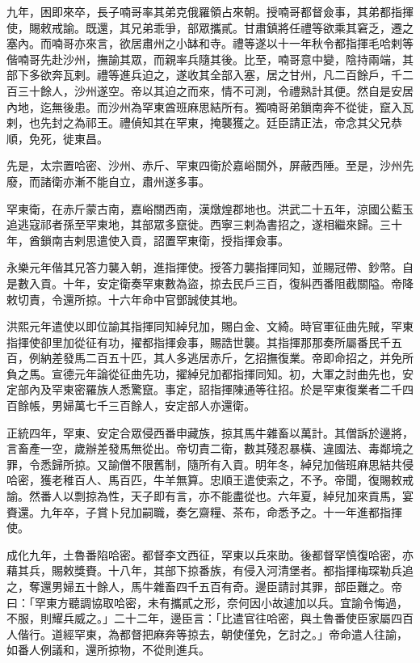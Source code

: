 \begin{pinyinscope}
九年，困即來卒，長子喃哥率其弟克俄羅領占來朝。授喃哥都督僉事，其弟都指揮使，賜敕戒諭。既還，其兄弟乖爭，部眾攜貳。甘肅鎮將任禮等欲乘其窘乏，遷之塞內。而喃哥亦來言，欲居肅州之小缽和寺。禮等遂以十一年秋令都指揮毛哈剌等偕喃哥先赴沙州，撫諭其眾，而親率兵隨其後。比至，喃哥意中變，陰持兩端，其部下多欲奔瓦剌。禮等進兵迫之，遂收其全部入塞，居之甘州，凡二百餘戶，千二百三十餘人，沙州遂空。帝以其迫之而來，情不可測，令禮熟計其便。然自是安居內地，迄無後患。而沙州為罕東酋班麻思結所有。獨喃哥弟鎖南奔不從徙，竄入瓦剌，也先封之為祁王。禮偵知其在罕東，掩襲獲之。廷臣請正法，帝念其父兄恭順，免死，徙東昌。

先是，太宗置哈密、沙州、赤斤、罕東四衛於嘉峪關外，屏蔽西陲。至是，沙州先廢，而諸衛亦漸不能自立，肅州遂多事。

罕東衛，在赤斤蒙古南，嘉峪關西南，漢燉煌郡地也。洪武二十五年，涼國公藍玉追逃寇祁者孫至罕東地，其部眾多竄徙。西寧三剌為書招之，遂相繼來歸。三十年，酋鎖南吉剌思遣使入貢，詔置罕東衛，授指揮僉事。

永樂元年偕其兄答力襲入朝，進指揮使。授答力襲指揮同知，並賜冠帶、鈔幣。自是數入貢。十年，安定衛奏罕東數為盜，掠去民戶三百，復糾西番阻截關隘。帝降敕切責，令還所掠。十六年命中官鄧誠使其地。

洪熙元年遣使以即位諭其指揮同知綽兒加，賜白金、文綺。時官軍征曲先賊，罕東指揮使卻里加從征有功，擢都指揮僉事，賜誥世襲。其指揮那那奏所屬番民千五百，例納差發馬二百五十匹，其人多逃居赤斤，乞招撫復業。帝即命招之，并免所負之馬。宣德元年論從征曲先功，擢綽兒加都指揮同知。初，大軍之討曲先也，安定部內及罕東密羅族人悉驚竄。事定，詔指揮陳通等往招。於是罕東復業者二千四百餘帳，男婦萬七千三百餘人，安定部人亦還衛。

正統四年，罕東、安定合眾侵西番申藏族，掠其馬牛雜畜以萬計。其僧訴於邊將，言畜產一空，歲辦差發馬無從出。帝切責二衛，數其殘忍暴橫、違國法、毒鄰境之罪，令悉歸所掠。又諭僧不限舊制，隨所有入貢。明年冬，綽兒加偕班麻思結共侵哈密，獲老稚百人、馬百匹，牛羊無算。忠順王遣使索之，不予。帝聞，復賜敕戒諭。然番人以剽掠為性，天子即有言，亦不能盡從也。六年夏，綽兒加來貢馬，宴賚還。九年卒，子賞卜兒加嗣職，奏乞齋糧、茶布，命悉予之。十一年進都指揮使。

成化九年，土魯番陷哈密。都督李文西征，罕東以兵來助。後都督罕慎復哈密，亦藉其兵，賜敕獎賚。十八年，其部下掠番族，有侵入河清堡者。都指揮梅琛勒兵追之，奪還男婦五十餘人，馬牛雜畜四千五百有奇。邊臣請討其罪，部臣難之。帝曰：「罕東方聽調協取哈密，未有攜貳之形，奈何因小故遽加以兵。宜諭令悔過，不服，則耀兵威之。」二十二年，邊臣言：「比遣官往哈密，與土魯番使臣家屬四百人偕行。道經罕東，為都督把麻奔等掠去，朝使僅免，乞討之。」帝命遣人往諭，如番人例議和，還所掠物，不從則進兵。


\end{pinyinscope}
